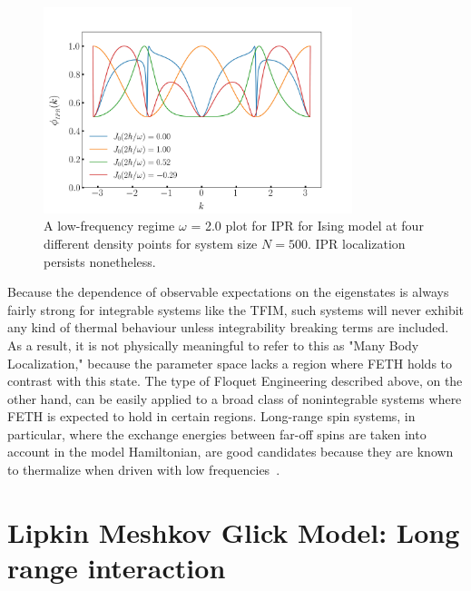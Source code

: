 \documentclass[%
reprint,
superscriptaddress,
amsmath,amssymb,
aps,
prb,
showkeys,
]{revtex4-2}
\begin{document}
	
	\begin{figure}[]
		\centering
		\includegraphics[height = 6cm, width =9cm]{low_frq_exactN500_ipr.jpeg}
		\caption{A low-frequency regime $\omega$ = 2.0 plot for IPR for Ising model at four different density points for system size $N = 500$. IPR localization persists nonetheless.}
		\label{fig:ipr:isinglowfrk}
	\end{figure}
	
	Because the dependence of observable expectations on the eigenstates is always fairly strong for integrable systems like the TFIM, such systems will never exhibit any kind of thermal behaviour unless integrability breaking terms are included. As a result, it is not physically meaningful to refer to this as "Many Body Localization," because the parameter space lacks a region where FETH holds to contrast with this state. The type of Floquet Engineering described above, on the other hand, can be easily applied to a broad class of nonintegrable systems where FETH is expected to hold in certain regions. Long-range spin systems, in particular, where the exchange energies between far-off spins are taken into account in the model Hamiltonian, are good candidates because they are known to thermalize when driven with low frequencies~\cite{russomanno_thermalization_2015}.
	\section{\label{sec:level3}Lipkin Meshkov Glick Model: Long range interaction}	
	
\end{document}
